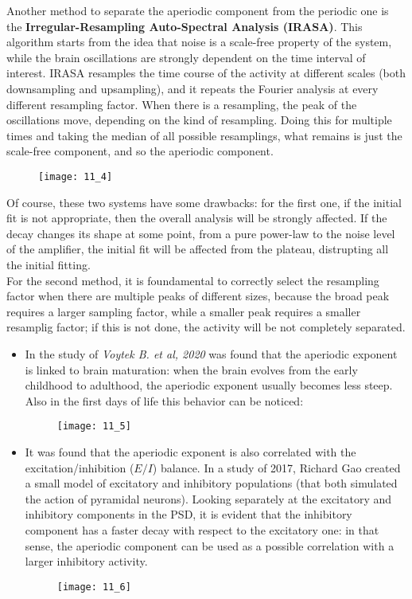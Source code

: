 \par\medskip
Another method to separate the aperiodic component from the periodic one is the \textbf{Irregular-Resampling Auto-Spectral Analysis (IRASA)}. This algorithm starts from the idea 
that noise is a scale-free property of the system, while the brain oscillations are strongly dependent on the time interval of interest. IRASA resamples the time course of the activity 
at different scales (both downsampling and upsampling), and it repeats the Fourier analysis at every different resampling factor. When there is a resampling, the peak of the oscillations 
move, depending on the kind of resampling. Doing this for multiple times and taking the median of all possible resamplings, what remains is just the scale-free component, and so the aperiodic 
component.
\begin{figure}[H]
    \texttt{[image: 11\_4]}
    \centering
\end{figure}
Of course, these two systems have some drawbacks: for the first one, if the initial fit is not appropriate, then the overall analysis will be strongly affected. If the decay changes its shape at 
some point, from a pure power-law to the noise level of the amplifier, the initial fit will be affected from the plateau, distrupting all the initial fitting.\\
For the second method, it is foundamental to correctly select the resampling factor when there are multiple peaks of different sizes, because the broad peak requires a larger sampling factor, while 
a smaller peak requires a smaller resamplig factor; if this is not done, the activity will be not completely separated.
\begin{itemize}
\item In the study of \textit{Voytek B. et al, 2020} was found that the aperiodic exponent is linked to brain maturation: when the brain evolves from the early childhood 
to adulthood, the aperiodic exponent usually becomes less steep. Also in the first days of life this behavior can be noticed:
\begin{figure}[H]
    \texttt{[image: 11\_5]}
    \centering
\end{figure}
\par\medskip
\item It was found that the aperiodic exponent is also correlated with the excitation/inhibition (\(E/I\)) balance. In a study of 2017, Richard Gao created a small model 
of excitatory and inhibitory populations (that both simulated the action of pyramidal neurons). Looking separately at the excitatory and inhibitory components in 
the PSD, it is evident that the inhibitory component has a faster decay with respect to the excitatory one: in that sense, the aperiodic component can be used as a possible 
correlation with a larger inhibitory activity.
\begin{figure}[H]
    \texttt{[image: 11\_6]}
    \centering
\end{figure}
\end{itemize}

